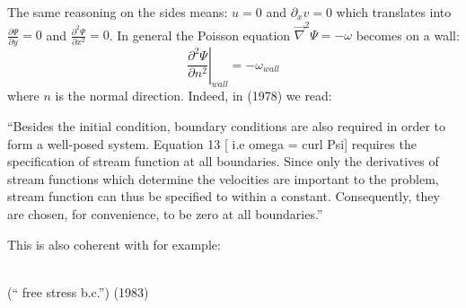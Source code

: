 The same reasoning on the sides means: $u=0$ and $\partial_x v = 0$ which 
translates into $\frac{\partial \Psi}{\partial y}=0$ and $\frac{\partial^2 \Psi}{\partial x^2}=0$.
In general the Poisson equation $\vec\nabla^2 \Psi = -\omega$ becomes on a wall: 
\[
\left. \frac{\partial^2 \Psi}{\partial n^2}\right\rvert_{wall}=-\omega_{wall}
\]
where $n$ is the normal direction.
Indeed, in \textcite{hsui78} (1978) we read:
\begin{displayquote}
{\color{darkgray}
``Besides the initial condition,
boundary conditions are also required in order to form a well-posed system. 
Equation 13 [ i.e omega = curl Psi] requires the specification of
stream function at all boundaries. Since only the derivatives of stream functions 
which determine the velocities are important to the problem, stream
function can thus be specified to within a constant. Consequently,
they are chosen, for convenience, to be zero at all boundaries.''
}
\end{displayquote}

\noindent This is also coherent with for example: 
\begin{center}
 \hspace{0.5cm} 
\\
(`` free stress b.c.'') \textcite{rimc81} \hspace{3cm} \textcite{mato83} (1983)
\end{center}

\begin{center}
\\
\textcite{haeb84} \hspace{4cm} \textcite{haeb88}
\end{center}

